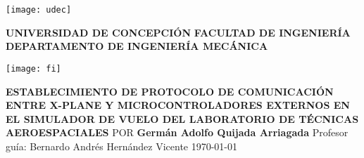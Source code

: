 \begin{titlepage}
\parbox{1.5cm}{
	\texttt{[image: udec]}
}
\hfill
\parbox[c][2cm]{0.7\textwidth}{
	\centering
	\textbf{UNIVERSIDAD DE CONCEPCIÓN}
	\vfill
	\textbf{FACULTAD DE INGENIERÍA}
	\vfill
	\textbf{DEPARTAMENTO DE INGENIERÍA MECÁNICA}
}
\hfill 
\parbox{1.5cm}{
	\texttt{[image: fi]}
}
\smallskip
\vspace*{6cm}
\centering
\textbf{ESTABLECIMIENTO DE PROTOCOLO DE COMUNICACIÓN ENTRE
X-PLANE Y MICROCONTROLADORES EXTERNOS EN EL SIMULADOR DE VUELO DEL LABORATORIO DE TÉCNICAS AEROESPACIALES}
\bigbreak
POR
\bigbreak
\textbf{Germán Adolfo Quijada Arriagada}
\vfill
Profesor guía:
\smallbreak
Bernardo Andrés Hernández Vicente
\vfill
\today
\end{titlepage}
